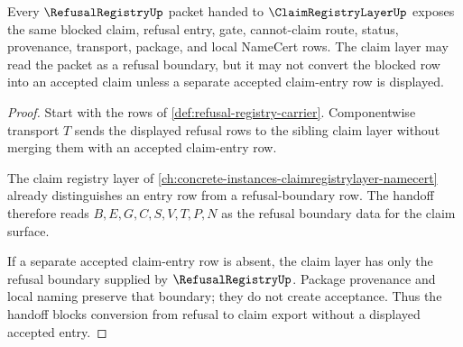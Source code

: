 \begin{theorem}
\label{thm:refusal-registry-claim-layer-handoff}
Every $\RefusalRegistryUp$ packet handed to $\ClaimRegistryLayerUp$ exposes the same blocked claim, refusal entry, gate, cannot-claim route, status, provenance, transport, package, and local NameCert rows. The claim layer may read the packet as a refusal boundary, but it may not convert the blocked row into an accepted claim unless a separate accepted claim-entry row is displayed.
\end{theorem}
\begin{proof}
Start with the rows of \autoref{def:refusal-registry-carrier}. Componentwise transport $T$ sends the displayed refusal rows to the sibling claim layer without merging them with an accepted claim-entry row.

The claim registry layer of \autoref{ch:concrete-instances-claimregistrylayer-namecert} already distinguishes an entry row from a refusal-boundary row. The handoff therefore reads $B,E,G,C,S,V,T,P,N$ as the refusal boundary data for the claim surface.

If a separate accepted claim-entry row is absent, the claim layer has only the refusal boundary supplied by $\RefusalRegistryUp$. Package provenance and local naming preserve that boundary; they do not create acceptance. Thus the handoff blocks conversion from refusal to claim export without a displayed accepted entry.
\end{proof}

